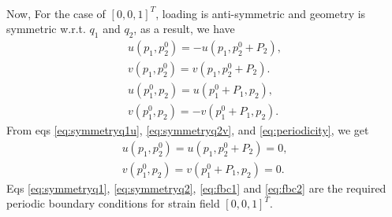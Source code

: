 \documentclass[openright,twoside]{iitkthesis}
\begin{document}
\\
Now, For the case of $[0, 0, 1]^T$, loading is anti-symmetric and geometry is symmetric w.r.t. $q_1$ and $q_2$, as a result, we have
\begin{eqnarray}
\label{eq:symmetryq1u}
u(p_1, p_2^0) = -u(p_1, p_2^0+P_2),\\
\label{eq:symmetryq1}
v(p_1, p_2^0) = v(p_1, p_2^0+P_2).\\
\label{eq:symmetryq2}
u(p_1^0, p_2) = u(p_1^0+P_1, p_2),\\
\label{eq:symmetryq2v}
v(p_1^0, p_2) = -v(p_1^0+P_1, p_2).
\end{eqnarray}
From eqs \eqref{eq:symmetryq1u}, \eqref{eq:symmetryq2v}, and \eqref{eq:periodicity}, we get
\begin{eqnarray}
\label{eq:fbc2}
u(p_1, p_2^0) = u(p_1, p_2^0+P_2) = 0,\\
\label{eq:fbc1}
v(p_1^0, p_2) = v(p_1^0+P_1, p_2) = 0.
\end{eqnarray}
Eqs \eqref{eq:symmetryq1}, \eqref{eq:symmetryq2}, \eqref{eq:fbc1} and 
\eqref{eq:fbc2} are the required periodic boundary conditions for strain field $[0, 0, 1]^T$.\\
\end{document}
